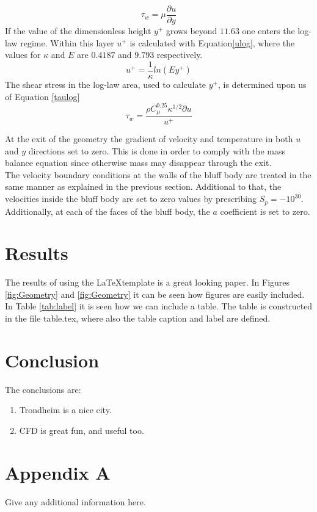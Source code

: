 \documentclass{CFD2017}
\begin{document}
\begin{equation}
\label{subtau}
\tau_w = \mu \frac{\partial u}{\partial y}
\end{equation}
If the value of the dimensionless height $y^+$ grows beyond $11.63$ one enters the log-law regime. Within this layer $u^+$ is calculated with Equation\ref{ulog}, where the values for $\kappa$ and $E$ are $0.4187$ and $9.793$ respectively.
\begin{equation}
\label{ulog}
u^+=\frac{1}{\kappa}ln(Ey^+)
\end{equation}
The shear stress in the log-law area, used to calculate $y^+$, is determined upon us of Equation \ref{taulog}
\begin{equation}
\label{taulog}
\tau_w = \frac{\rho C_{\mu}^{0.25}\kappa^{1/2}\partial u}{u^+}
\end{equation}


 At the exit of the geometry the gradient of velocity and temperature in both $u$ and $y$ directions set to zero. This is done in order to comply with the mass balance equation since otherwise mass may disappear through the exit.\\

The velocity boundary conditions at the walls of the bluff body are treated in the same manner as explained in the previous section. Additional to that, the velocities inside the bluff body are set to zero values by prescribing $S_p=-10^{30}$. Additionally, at each of the faces of the bluff body, the $a$ coefficient is set to zero. \\


\section{Results}
The results of using the \LaTeX template is a great looking paper.
In Figures \ref{fig:Geometry} and \ref{fig:Geometry} it can be seen how figures are easily included.
In Table \ref{tab:label} it is seen how we can include a table.
The table is constructed in the file table.tex, where also the table caption and label are defined.

\newpage
{}

\section{Conclusion}
The conclusions are:
\begin{enumerate}
  \item Trondheim is a nice city.
  \item CFD is great fun, and useful too.
\end{enumerate}






\newpage
\section{Appendix A}
Give any additional information here.
\end{document}

